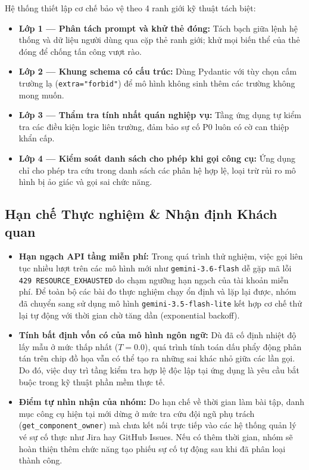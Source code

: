 \documentclass[11pt,a4paper]{article}
\begin{document}
Hệ thống thiết lập cơ chế bảo vệ theo 4 ranh giới kỹ thuật tách biệt:
\begin{itemize}
  \item \textbf{Lớp 1 --- Phân tách prompt và khử thẻ đóng:} Tách bạch giữa lệnh hệ thống và dữ liệu người dùng qua cặp thẻ ranh giới; khử mọi biến thể của thẻ đóng để chống tấn công vượt rào.
  \item \textbf{Lớp 2 --- Khung schema có cấu trúc:} Dùng Pydantic với tùy chọn cấm trường lạ (\texttt{extra="forbid"}) để mô hình không sinh thêm các trường không mong muốn.
  \item \textbf{Lớp 3 --- Thẩm tra tính nhất quán nghiệp vụ:} Tầng ứng dụng tự kiểm tra các điều kiện logic liên trường, đảm bảo sự cố P0 luôn có cờ can thiệp khẩn cấp.
  \item \textbf{Lớp 4 --- Kiểm soát danh sách cho phép khi gọi công cụ:} Ứng dụng chỉ cho phép tra cứu trong danh sách các phân hệ hợp lệ, loại trừ rủi ro mô hình bị ảo giác và gọi sai chức năng.
\end{itemize}

\subsection{Hạn chế Thực nghiệm \& Nhận định Khách quan}

\begin{itemize}
  \item \textbf{Hạn ngạch API tầng miễn phí:} Trong quá trình thử nghiệm, việc gọi liên tục nhiều lượt trên các mô hình mới như \texttt{gemini-3.6-flash} dễ gặp mã lỗi \texttt{429 RESOURCE\_EXHAUSTED} do chạm ngưỡng hạn ngạch của tài khoản miễn phí. Để toàn bộ các bài đo thực nghiệm chạy ổn định và lặp lại được, nhóm đã chuyển sang sử dụng mô hình \texttt{gemini-3.5-flash-lite} kết hợp cơ chế thử lại tự động với thời gian chờ tăng dần (exponential backoff).
  \item \textbf{Tính bất định vốn có của mô hình ngôn ngữ:} Dù đã cố định nhiệt độ lấy mẫu ở mức thấp nhất ($T = 0.0$), quá trình tính toán dấu phẩy động phân tán trên chip đồ họa vẫn có thể tạo ra những sai khác nhỏ giữa các lần gọi. Do đó, việc duy trì tầng kiểm tra hợp lệ độc lập tại ứng dụng là yêu cầu bắt buộc trong kỹ thuật phần mềm thực tế.
  \item \textbf{Điểm tự nhìn nhận của nhóm:} Do hạn chế về thời gian làm bài tập, danh mục công cụ hiện tại mới dừng ở mức tra cứu đội ngũ phụ trách (\texttt{get\_component\_owner}) mà chưa kết nối trực tiếp vào các hệ thống quản lý vé sự cố thực như Jira hay GitHub Issues. Nếu có thêm thời gian, nhóm sẽ hoàn thiện thêm chức năng tạo phiếu sự cố tự động sau khi đã phân loại thành công.
\end{itemize}
\end{document}
